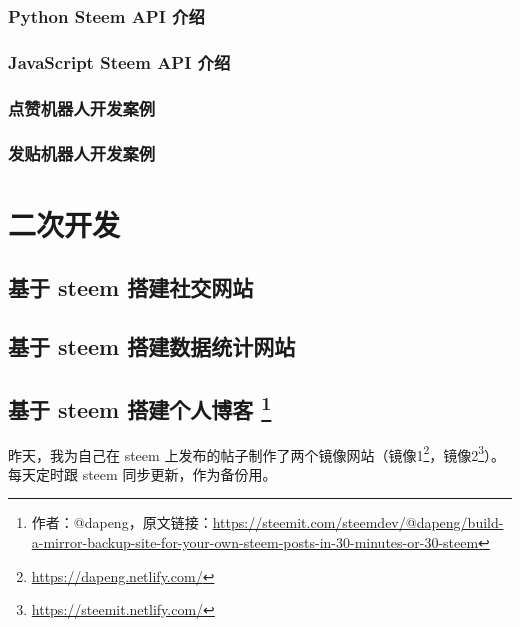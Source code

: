 \documentclass[]{ctexbook}
\renewcommand{\href}[2]{#2\footnote{\url{#1}}}
\begin{document}
\hypertarget{python_api}{%
\subsection{Python Steem API 介绍}\label{python_api}}

\hypertarget{JavaScript_api}{%
\subsection{JavaScript Steem API 介绍}\label{JavaScript_api}}

\hypertarget{upvotebot}{%
\subsection{点赞机器人开发案例}\label{upvotebot}}

\hypertarget{postbot}{%
\subsection{发贴机器人开发案例}\label{postbot}}

\hypertarget{eckfp}{%
\chapter{二次开发}\label{eckfp}}

\hypertarget{jw_steem_djsjwz}{%
\section{基于 steem 搭建社交网站}\label{jw_steem_djsjwz}}

\hypertarget{jw_steem_djsjtjwz}{%
\section{基于 steem 搭建数据统计网站}\label{jw_steem_djsjtjwz}}

\hypertarget{-steem-}{%
\section[基于 steem 搭建个人博客 ]{\texorpdfstring{基于 steem 搭建个人博客 \footnote{作者：@dapeng，原文链接：\url{https://steemit.com/steemdev/@dapeng/build-a-mirror-backup-site-for-your-own-steem-posts-in-30-minutes-or-30-steem}}}{基于 steem 搭建个人博客 }}\label{-steem-}}

昨天，我为自己在 steem 上发布的帖子制作了两个镜像网站（\href{https://dapeng.netlify.com/}{镜像1}，\href{https://steemit.netlify.com/}{镜像2}）。每天定时跟 steem 同步更新，作为备份用。
\end{document}
